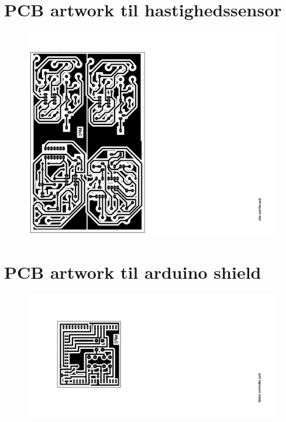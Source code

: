 \section{PCB artwork til hastighedssensor}\label{bilag:afsenderModtagerArtwork}
\begin{figure}[H]
	\centering
    \includegraphics[width=210mm]{figures/2_5fremstilling/afsenderModtagerArtwork.png}
\end{figure}


\section{PCB artwork til arduino shield} \label{bilag:shieldArtwork}
\begin{figure}[H]
	\centering
    \includegraphics[width=210mm]{figures/2_5fremstilling/shieldArtwork.png}
\end{figure}

